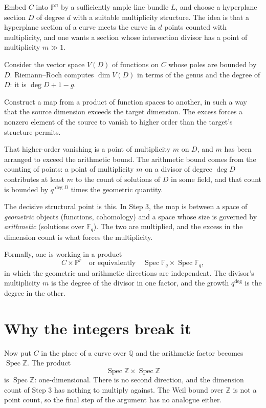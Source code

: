 \begin{description}[style=nextline,leftmargin=0pt,labelwidth=0pt,labelsep=0pt,font=\sffamily\bfseries\small,
  itemsep=6pt]
\item[Step 1.] Embed $C$ into $\mathbb{P}^n$ by a sufficiently ample line bundle
$L$, and choose a hyperplane section $D$ of degree $d$ with a suitable
multiplicity structure. The idea is that a hyperplane section of a curve meets
the curve in $d$ points counted with multiplicity, and one wants a section
whose intersection divisor has a point of multiplicity $m \gg 1$.
\item[Step 2.] Consider the vector space $V(D)$ of functions on $C$ whose poles
are bounded by $D$. Riemann--Roch computes $\dim V(D)$ in terms of the genus and
the degree of $D$: it is $\deg D + 1 - g$.
\item[Step 3.] Construct a map from a product of function spaces to another, in
such a way that the source dimension exceeds the target dimension. The excess
forces a nonzero element of the source to vanish to higher order than the
target's structure permits.
\item[Step 4.] That higher-order vanishing is a point of multiplicity $m$ on
$D$, and $m$ has been arranged to exceed the arithmetic bound. The arithmetic
bound comes from the counting of points: a point of multiplicity $m$ on a
divisor of degree $\deg D$ contributes at least $m$ to the count of solutions
of $D$ in some field, and that count is bounded by $q^{\deg D}$ times the
geometric quantity.
\end{description}

The decisive structural point is this. In Step 3, the map is between a space
of \emph{geometric} objects (functions, cohomology) and a space whose size is
governed by \emph{arithmetic} (solutions over $\mathbb{F}_q$). The two are
multiplied, and the excess in the dimension count is what forces the
multiplicity.

Formally, one is working in a product
\begin{equation}
C \times \mathbb{P}^{r} \quad\text{or equivalently}\quad \operatorname{Spec}\mathbb{F}_q \times \operatorname{Spec}\mathbb{F}_q,
\end{equation}
in which the geometric and arithmetic directions are independent. The divisor's
multiplicity $m$ is the degree of the divisor in one factor, and the growth
$q^{\deg}$ is the degree in the other.

\section{Why the integers break it}Now put $C$ in the place of a curve over $\mathbb{Q}$ and the arithmetic factor
becomes $\operatorname{Spec}\mathbb{Z}$. The product
\[
\operatorname{Spec}\mathbb{Z} \times \operatorname{Spec}\mathbb{Z}
\]
is $\operatorname{Spec}\mathbb{Z}$: one-dimensional. There is no second
direction, and the dimension count of Step 3 has nothing to multiply against.
The Weil bound over $\mathbb{Z}$ is not a point count, so the final step of the
argument has no analogue either.

